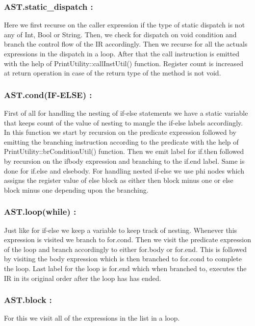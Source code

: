 \documentclass{article}
\begin{document}
\subsubsection{AST.static\_dispatch :}
Here we first recurse on the caller expression if the type of static dispatch is not any of Int, Bool or String. Then, we check for dispatch on void condition and branch the control flow of the IR accordingly.    
Then we recurse for all the actuals expressions in the dispatch in a loop. After that the call instruction is emitted with the help of PrintUtility::callInstUtil() function. Register count is increased at return operation in case of the return type of the method is not void.

\subsubsection{AST.cond(IF-ELSE) :}
First of all for handling the nesting of if-else statements we have a static variable that keeps count of the value of nesting to mangle the if-else labels accordingly. In this function we start by recursion on the predicate expression followed by emitting the branching instruction according to the predicate with the help of PrintUtility::brConditionUtil() function. Then we emit label for if.then followed by recursion on the ifbody expression and branching to the if.end label. Same is done for if.else and elsebody. For handling nested if-else we use phi nodes which assigns the register value of else block as either then block minus one or else block minus one depending upon the branching.

\subsubsection{AST.loop(while) :}
Just like for if-else we keep a variable to keep track of nesting. Whenever this expression is visited we branch to for.cond. Then we visit the predicate expression of the loop and branch accordingly to either for.body or for.end. This is followed by visiting the body expression which is then branched to for.cond to complete the loop. Last label for the loop is for.end which when branched to, executes the IR in its original order after the loop has has ended.

\subsubsection{AST.block :}
For this we visit all of the expressions in the list in a loop.
\end{document}
